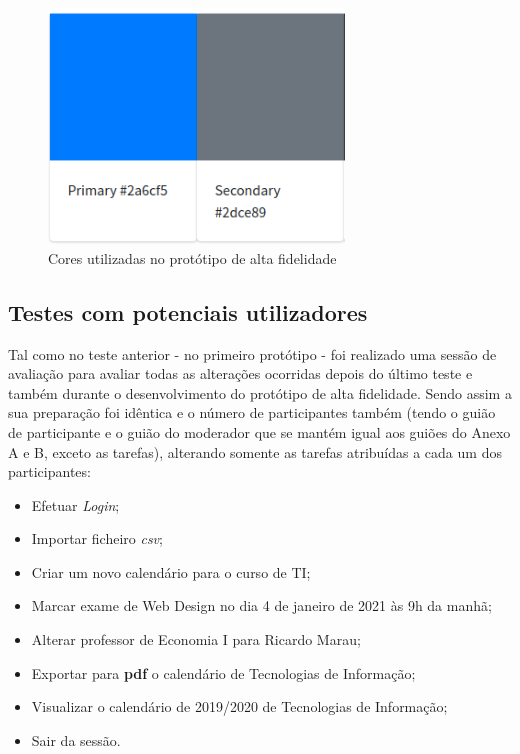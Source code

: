 \documentclass[11pt, twoside]{report}
\begin{document}
	\begin{figure}[H] 
		\centering 							\includegraphics[width=0.7\textwidth,height=0.7\textheight,keepaspectratio]{image/cores}
		\caption{Cores utilizadas no protótipo de alta fidelidade }
		\label{cores}
	\end{figure}
	
	
	\subsection{Testes com potenciais utilizadores}
	
	Tal como no teste anterior - no primeiro protótipo - foi realizado uma sessão de avaliação para avaliar todas as alterações ocorridas depois do último teste e também durante o desenvolvimento do protótipo de alta fidelidade.
	Sendo assim a sua preparação foi idêntica e o número de participantes também (tendo o guião de participante e o guião do moderador que se mantém igual aos guiões do Anexo A e B, exceto as tarefas), alterando somente as tarefas atribuídas a cada um dos participantes: 
	
	\begin{itemize}
		\item Efetuar \textit{Login};
		\item Importar ficheiro \textit{csv};
		\item Criar um novo calendário para o curso de TI;
		\item Marcar exame de Web Design no dia 4 de janeiro de 2021 às 9h da manhã;
		\item Alterar professor de Economia I para Ricardo Marau;
		\item Exportar para \textbf{pdf} o calendário de Tecnologias de Informação;
		\item Visualizar o calendário de 2019/2020 de Tecnologias de Informação;
		\item Sair da sessão.
		
	\end{itemize}
	
\end{document}
